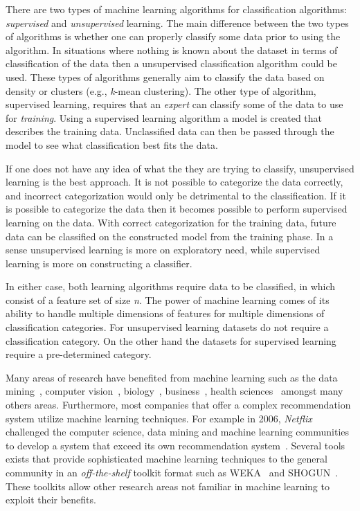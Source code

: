 There are two types of machine learning algorithms for classification algorithms: \emph{supervised} and \emph{unsupervised} learning. The main difference between the two types of algorithms is whether one can properly classify some data prior to using the algorithm. In situations where nothing is known about the dataset in terms of classification of the data then a unsupervised classification algorithm could be used. These types of algorithms generally aim to classify the data based on density or clusters (e.g., \emph{k}-mean clustering). The other type of algorithm, supervised learning, requires that an \emph{expert} can classify some of the data to use for \emph{training}. Using a supervised learning algorithm a model is created that describes the training data. Unclassified data can then be passed through the model to see what classification best fits the data.

If one does not have any idea of what the they are trying to classify, unsupervised learning is the best approach. It is not possible to categorize the data correctly, and incorrect categorization would only be detrimental to the classification. If it is possible to categorize the data then it becomes possible to perform supervised learning on the data. With correct categorization for the training data, future data can be classified on the constructed model from the training phase. In a sense unsupervised learning is more on exploratory need, while supervised learning is more on constructing a classifier.

In either case, both learning algorithms require data to be classified, in which consist of a feature set of size \emph{n}. The power of machine learning comes of its ability to handle multiple dimensions of features for multiple dimensions of classification categories. For unsupervised learning datasets do not require a classification category. On the other hand the datasets for supervised learning require a pre-determined category.

Many areas of research have benefited from machine learning such as the data mining~\cite{WFH11}, computer vision~\cite{Her03}, biology~\cite{OLP08}, business~\cite{Her00}, health sciences~\cite{Kon01} amongst many others areas. Furthermore, most companies that offer a complex recommendation system utilize machine learning techniques. For example in 2006, \emph{Netflix} challenged the computer science, data mining and machine learning communities to develop a system that exceed its own recommendation system~\cite{BL07}. Several tools exists that provide sophisticated machine learning techniques to the general community in an \emph{off-the-shelf} toolkit format such as WEKA~\cite{HFH+09} and SHOGUN~\cite{SRH+10}. These toolkits allow other research areas not familiar in machine learning to exploit their benefits.



